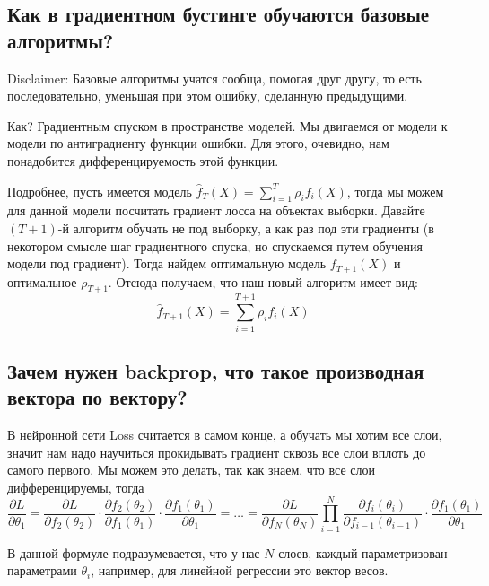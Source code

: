 \subsection{Как в градиентном бустинге обучаются базовые алгоритмы?}

Disclaimer: Базовые алгоритмы учатся сообща, помогая друг другу, то есть последовательно, уменьшая при этом ошибку, сделанную предыдущими.

Как? Градиентным спуском в пространстве моделей. Мы двигаемся от модели к модели по антиградиенту функции ошибки. Для этого, очевидно, нам понадобится дифференцируемость этой функции.

Подробнее, пусть имеется модель $\hat{f}_T(X) = \sum\limits_{i = 1}^T \rho_i f_i(X)$, тогда мы можем для данной модели посчитать градиент лосса на объектах выборки. Давайте $(T + 1)$-й алгоритм обучать не под выборку, а как раз под эти градиенты (в некотором смысле шаг градиентного спуска, но спускаемся путем обучения модели под градиент). Тогда найдем оптимальную модель $f_{T + 1}(X)$ и оптимальное $\rho_{T + 1}$. Отсюда получаем, что наш новый алгоритм имеет вид:
$$
\hat{f}_{T + 1}(X) = \sum\limits_{i = 1}^{T + 1} \rho_i f_i(X)
$$






\subsection{Зачем нужен backprop, что такое производная вектора по вектору?}

В нейронной сети Loss считается в самом конце, а обучать мы хотим все слои, значит нам надо научиться прокидывать градиент сквозь все слои вплоть до самого первого. Мы можем это делать, так как знаем, что все слои дифференцируемы, тогда
\begin{equation*}
    \frac{\partial L}{\partial \theta_1} = \frac{\partial L}{\partial f_2(\theta_2)} \cdot \frac{\partial f_2(\theta_2)}{\partial f_1(\theta_1)} \cdot \frac{\partial f_1(\theta_1)}{\partial \theta_1} = \ldots = \frac{\partial L}{\partial f_N(\theta_N)} \prod\limits_{i = 1}^N \frac{\partial f_i(\theta_i)}{\partial f_{i - 1}(\theta_{i - 1})} \cdot \frac{\partial f_1(\theta_1)}{\partial \theta_1}
\end{equation*}

В данной формуле подразумевается, что у нас $N$ слоев, каждый параметризован параметрами $\theta_i$, например, для линейной регрессии это вектор весов.

